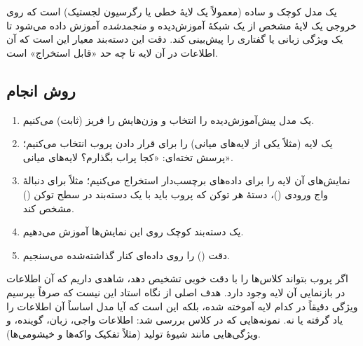 \begin{definitionbox}{}
 یک مدل کوچک و ساده (معمولاً یک لایهٔ خطی یا رگرسیون لجستیک) است که روی خروجی یک لایهٔ مشخص از یک شبکهٔ آموزش‌دیده و \emph{منجمد‌شده} آموزش داده می‌شود تا یک ویژگی زبانی یا گفتاری را پیش‌بینی کند. دقت این دسته‌بند معیار این است که آن اطلاعات در آن لایه تا چه حد «قابل استخراج» است.
\end{definitionbox}

\subsection{روش انجام}
\begin{enumerate}
  \item یک مدل پیش‌آموزش‌دیده را انتخاب و وزن‌هایش را فریز (ثابت) می‌کنیم.
  \item یک لایه (مثلاً یکی از لایه‌های میانی) را برای قرار دادن پروب انتخاب می‌کنیم؛ پرسش تخته‌ای: «کجا پراب بگذارم؟ لایه‌های میانی».
  \item نمایش‌های آن لایه را برای داده‌های برچسب‌دار استخراج می‌کنیم؛ مثلاً برای دنبالهٔ واج ورودی ()، دستهٔ  هر توکن که پروب باید با یک دسته‌بند در سطح توکن () مشخص کند.
  \item یک دسته‌بند کوچک روی این نمایش‌ها آموزش می‌دهیم.
  \item دقت () را روی داده‌ای کنار گذاشته‌شده می‌سنجیم.
\end{enumerate}
اگر پروب بتواند کلاس‌ها را با دقت خوبی تشخیص دهد، شاهدی داریم که آن اطلاعات در بازنمایی آن لایه وجود دارد. هدف اصلی از نگاه استاد این نیست که صرفاً بپرسیم ویژگی دقیقاً در کدام لایه آموخته شده، بلکه این است که آیا مدل اساساً آن اطلاعات را یاد گرفته یا نه. نمونه‌هایی که در کلاس بررسی شد: اطلاعات واجی، زبان، گوینده، و ویژگی‌هایی مانند شیوهٔ تولید (مثلاً تفکیک واکه‌ها و خیشومی‌ها).

